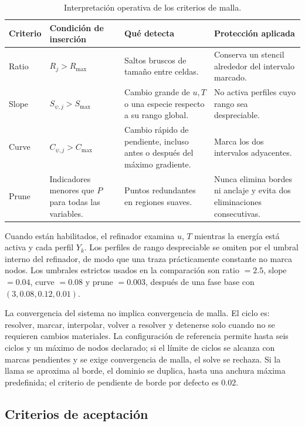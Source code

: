 \documentclass[12pt,a4paper,twoside,openany]{book}
\begin{document}
\begin{table}[htbp]
\centering
\caption{Interpretación operativa de los criterios de malla.}
\label{tab:mesh-criteria-meaning}
\begin{tabularx}{\textwidth}{@{}p{}p{}YY@{}}
\toprule
\textbf{Criterio} & \textbf{Condición de inserción} & \textbf{Qué detecta} &
\textbf{Protección aplicada} \\
\midrule
Ratio & \(R_j>R_{\max}\) & Saltos bruscos de tamaño entre celdas. & Conserva un
stencil alrededor del intervalo marcado. \\
Slope & \(S_{\psi,j}>S_{\max}\) & Cambio grande de \(u,T\) o una especie respecto
a su rango global. & No activa perfiles cuyo rango sea despreciable. \\
Curve & \(C_{\psi,j}>C_{\max}\) & Cambio rápido de pendiente, incluso antes o
después del máximo gradiente. & Marca los dos intervalos adyacentes. \\
Prune & Indicadores menores que \(P\) para todas las variables. & Puntos
redundantes en regiones suaves. & Nunca elimina bordes ni anclaje y evita dos
eliminaciones consecutivas. \\
\bottomrule
\end{tabularx}
\end{table}

Cuando están habilitados, el refinador examina \(u\), \(T\) mientras la energía
está activa y cada perfil \(Y_k\). Los perfiles de rango despreciable se omiten
por el umbral interno del refinador, de modo que una traza prácticamente
constante no marca nodos. Los umbrales estrictos usados en la comparación son
ratio \(=2.5\), slope \(=0.04\), curve \(=0.08\) y prune \(=0.003\), después de
una fase base con \((3,0.08,0.12,0.01)\).

La convergencia del sistema no implica convergencia de malla. El ciclo es:
resolver, marcar, interpolar, volver a resolver y detenerse solo cuando no se
requieren cambios materiales. La configuración de referencia permite hasta seis
ciclos y un máximo de nodos declarado; si el límite de ciclos se alcanza con
marcas pendientes y se exige convergencia de malla, el solve se rechaza. Si la llama se
aproxima al borde, el dominio se duplica, hasta una anchura máxima predefinida;
el criterio de pendiente de borde por defecto es \(0.02\).

\subsection{Criterios de aceptación}
\label{sec:certification}
\end{document}
